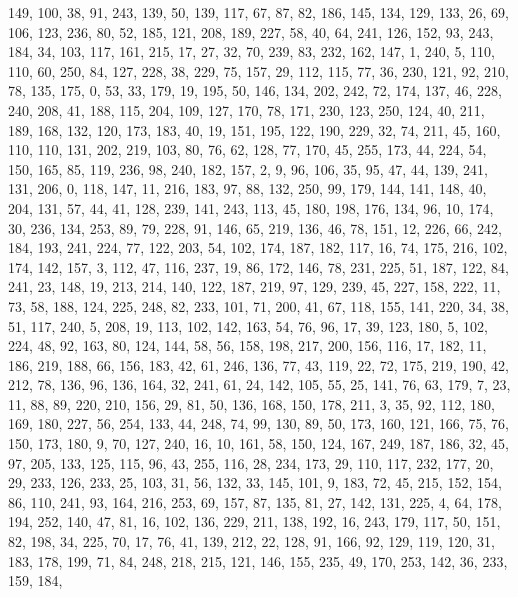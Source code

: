 \begin{DoxyCode}
       149, 100, 38, 91, 243, 139, 50, 139, 117, 67, 87, 82, 186, 145, 134, 129, 133, 26, 69, 106, 123, 236, 80, 52,
       185, 121, 208, 189, 227, 58, 40, 64, 241, 126, 152, 93, 243, 184, 34, 103, 117, 161, 215, 17, 27, 32, 70,
       239, 83, 232, 162, 147, 1, 240, 5, 110, 110, 60, 250, 84, 127, 228, 38, 229, 75, 157, 29, 112, 115, 77, 36,
       230, 121, 92, 210, 78, 135, 175, 0, 53, 33, 179, 19, 195, 50, 146, 134, 202, 242, 72, 174, 137, 46, 228, 240,
       208, 41, 188, 115, 204, 109, 127, 170, 78, 171, 230, 123, 250, 124, 40, 211, 189, 168, 132, 120, 173, 183,
       40, 19, 151, 195, 122, 190, 229, 32, 74, 211, 45, 160, 110, 110, 131, 202, 219, 103, 80, 76, 62, 128, 77,
       170, 45, 255, 173, 44, 224, 54, 150, 165, 85, 119, 236, 98, 240, 182, 157, 2, 9, 96, 106, 35, 95, 47, 44, 139,
       241, 131, 206, 0, 118, 147, 11, 216, 183, 97, 88, 132, 250, 99, 179, 144, 141, 148, 40, 204, 131, 57, 44,
       41, 128, 239, 141, 243, 113, 45, 180, 198, 176, 134, 96, 10, 174, 30, 236, 134, 253, 89, 79, 228, 91, 146,
       65, 219, 136, 46, 78, 151, 12, 226, 66, 242, 184, 193, 241, 224, 77, 122, 203, 54, 102, 174, 187, 182, 117,
       16, 74, 175, 216, 102, 174, 142, 157, 3, 112, 47, 116, 237, 19, 86, 172, 146, 78, 231, 225, 51, 187, 122, 84,
       241, 23, 148, 19, 213, 214, 140, 122, 187, 219, 97, 129, 239, 45, 227, 158, 222, 11, 73, 58, 188, 124, 225,
       248, 82, 233, 101, 71, 200, 41, 67, 118, 155, 141, 220, 34, 38, 51, 117, 240, 5, 208, 19, 113, 102, 142,
       163, 54, 76, 96, 17, 39, 123, 180, 5, 102, 224, 48, 92, 163, 80, 124, 144, 58, 56, 158, 198, 217, 200, 156,
       116, 17, 182, 11, 186, 219, 188, 66, 156, 183, 42, 61, 246, 136, 77, 43, 119, 22, 72, 175, 219, 190, 42, 212,
       78, 136, 96, 136, 164, 32, 241, 61, 24, 142, 105, 55, 25, 141, 76, 63, 179, 7, 23, 11, 88, 89, 220, 210, 156,
       29, 81, 50, 136, 168, 150, 178, 211, 3, 35, 92, 112, 180, 169, 180, 227, 56, 254, 133, 44, 248, 74, 99,
       130, 89, 50, 173, 160, 121, 166, 75, 76, 150, 173, 180, 9, 70, 127, 240, 16, 10, 161, 58, 150, 124, 167, 249,
       187, 186, 32, 45, 97, 205, 133, 125, 115, 96, 43, 255, 116, 28, 234, 173, 29, 110, 117, 232, 177, 20, 29,
       233, 126, 233, 25, 103, 31, 56, 132, 33, 145, 101, 9, 183, 72, 45, 215, 152, 154, 86, 110, 241, 93, 164, 216,
       253, 69, 157, 87, 135, 81, 27, 142, 131, 225, 4, 64, 178, 194, 252, 140, 47, 81, 16, 102, 136, 229, 211, 138,
       192, 16, 243, 179, 117, 50, 151, 82, 198, 34, 225, 70, 17, 76, 41, 139, 212, 22, 128, 91, 166, 92, 129,
       119, 120, 31, 183, 178, 199, 71, 84, 248, 218, 215, 121, 146, 155, 235, 49, 170, 253, 142, 36, 233, 159, 184,

\end{DoxyCode}
